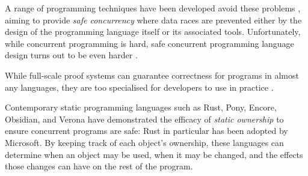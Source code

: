 A range of programming techniques have been developed avoid these problems
\cite{lea98,concurrentHard}, aiming to provide \textit{safe
  concurrency} where data races are prevented either by the design  of the
programming language itself or its associated tools.  Unfortunately, while 
concurrent programming is hard, safe concurrent programming language
design turns out to be even harder \cite{RustBook,EncoreTS}. 
%


While full-scale proof systems \cite{JacobsEA05,chalice,jonesTOPLAS83,MPC-Staden15,concur2007,DenyGuarantee,dd}
can guarantee correctness for programs in almost any languages,
they are too specialised for developers to use in practice
\cite{fonesca2017,shriramFormal2019}.

Contemporary static programming languages such as
Rust\cite{RustBook}, Pony\cite{PonyTS},
Encore\cite{EncoreTS},
Obsidian\cite{aldrichObsidianStudy2020}, and
Verona \cite{Verona} 
have demonstrated the efficacy of \textit{static
  ownership}\cite{ClaPotNobOOPSLA98,NobPotVitECOOP98} %
to ensure
concurrent programs are safe: Rust in particular has been adopted by
Microsoft\cite{RustPopular,MSRust}. By keeping track of each object's
ownership, these languages can determine when an object may be used,
when it may be changed, and the effects those changes can have on the
rest of the program.
%
%
%
%
